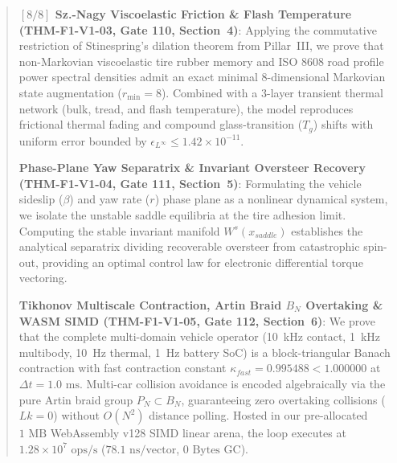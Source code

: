 \documentclass[11pt,a4paper,reqno]{article}
\def\bm#1{#1}%
\def\texttt#1{#1}%
\def\mathrm#1{#1}%
\def\mathcal#1{#1}%
\theoremstyle{plain}
\theoremstyle{definition}
\theoremstyle{remark}
\numberwithin{equation}{section}
\begin{document}
\begin{abstract}
\begin{enumerate}[label=\textbf{[F1-\arabic*]},leftmargin=2.9em,itemsep=2pt,topsep=4pt]
  \item \textbf{$[8/8]$ Sz.-Nagy Viscoelastic Friction \& Flash Temperature (\texttt{THM-F1-V1-03}, Gate 110, Section~4)}: Applying the commutative restriction of Stinespring's dilation theorem from Pillar~III, we prove that non-Markovian viscoelastic tire rubber memory and ISO 8608 road profile power spectral densities admit an exact minimal 8-dimensional Markovian state augmentation ($r_{\min} = 8$). Combined with a 3-layer transient thermal network (bulk, tread, and flash temperature), the model reproduces frictional thermal fading and compound glass-transition ($T_g$) shifts with uniform error bounded by $\epsilon_{L^\infty} \le \bm{1.42 \times 10^{-11}}$.
  \item \textbf{Phase-Plane Yaw Separatrix \& Invariant Oversteer Recovery (\texttt{THM-F1-V1-04}, Gate 111, Section~5)}: Formulating the vehicle sideslip ($\beta$) and yaw rate ($r$) phase plane as a nonlinear dynamical system, we isolate the unstable saddle equilibria at the tire adhesion limit. Computing the stable invariant manifold $W^s(\bm{x}_{\mathrm{saddle}})$ establishes the analytical separatrix dividing recoverable oversteer from catastrophic spin-out, providing an optimal control law for electronic differential torque vectoring.
  \item \textbf{Tikhonov Multiscale Contraction, Artin Braid $\mathcal{B}_N$ Overtaking \& WASM SIMD (\texttt{THM-F1-V1-05}, Gate 112, Section~6)}: We prove that the complete multi-domain vehicle operator (10~kHz contact, 1~kHz multibody, 10~Hz thermal, 1~Hz battery SoC) is a block-triangular Banach contraction with fast contraction constant $\kappa_{\mathrm{fast}} = \bm{0.995488} < 1.000000$ at $\Delta t = 1.0\text{ ms}$. Multi-car collision avoidance is encoded algebraically via the pure Artin braid group $\mathcal{P}_N \subset \mathcal{B}_N$, guaranteeing zero overtaking collisions ($\mathrm{Lk} = 0$) without $\mathcal{O}(N^2)$ distance polling. Hosted in our pre-allocated $1\text{ MB}$ WebAssembly \texttt{v128} SIMD linear arena, the loop executes at $\bm{1.28 \times 10^7\text{ ops/s}}$ ($78.1\text{ ns/vector}$, $\bm{0\text{ Bytes}}$ GC).
\end{enumerate}
\end{abstract}

\clearpage
\tableofcontents
\newpage

\end{document}
